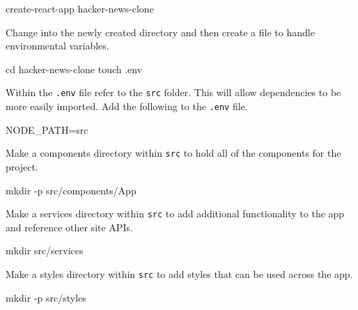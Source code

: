 \documentclass[]{book}
\newenvironment{Shaded}{\begin{snugshade}}{\end{snugshade}}
\newcommand{\FunctionTok}[1]{\textcolor[rgb]{0.00,0.00,0.00}{#1}}
\newcommand{\VariableTok}[1]{\textcolor[rgb]{0.00,0.00,0.00}{#1}}
\newcommand{\BuiltInTok}[1]{#1}
\newcommand{\ExtensionTok}[1]{#1}
\newcommand{\NormalTok}[1]{#1}
\begin{document}
\begin{Shaded}
\begin{Highlighting}[]
\ExtensionTok{create-react-app}\NormalTok{ hacker-news-clone}
\end{Highlighting}
\end{Shaded}

Change into the newly created directory and then create a file to handle
environmental variables.

\begin{Shaded}
\begin{Highlighting}[]
\BuiltInTok{cd}\NormalTok{ hacker-news-clone}
\FunctionTok{touch}\NormalTok{ .env}
\end{Highlighting}
\end{Shaded}

Within the \texttt{.env} file refer to the \texttt{src} folder. This
will allow dependencies to be more easily imported. Add the following to
the \texttt{.env} file.

\begin{Shaded}
\begin{Highlighting}[]
\VariableTok{NODE_PATH=}\NormalTok{src}
\end{Highlighting}
\end{Shaded}

Make a components directory within \texttt{src} to hold all of the
components for the project.

\begin{Shaded}
\begin{Highlighting}[]
\FunctionTok{mkdir}\NormalTok{ -p src/components/App}
\end{Highlighting}
\end{Shaded}

Make a services directory within \texttt{src} to add additional
functionality to the app and reference other site APIs.

\begin{Shaded}
\begin{Highlighting}[]
\FunctionTok{mkdir}\NormalTok{ src/services}
\end{Highlighting}
\end{Shaded}

Make a styles directory within \texttt{src} to add styles that can be
used across the app.

\begin{Shaded}
\begin{Highlighting}[]
\FunctionTok{mkdir}\NormalTok{ -p src/styles}
\end{Highlighting}
\end{Shaded}
\end{document}
